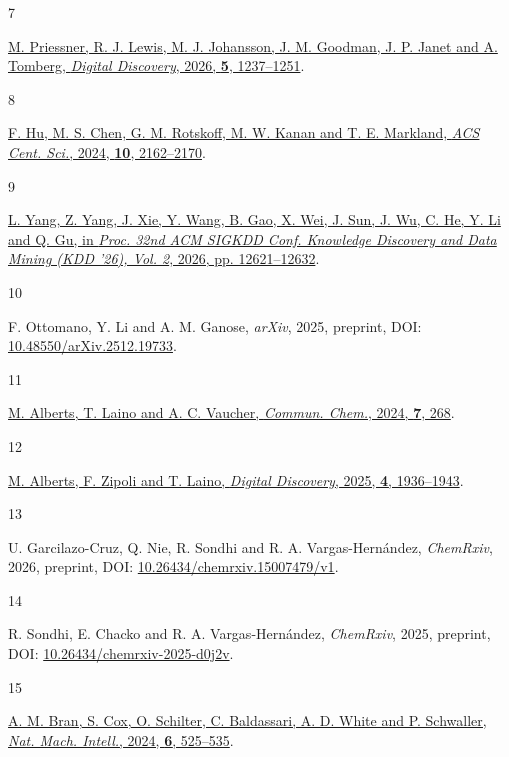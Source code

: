 \documentclass[
  10pt,
]{article}
\newlength{\cslhangindent}
\newlength{\csllabelwidth}
\newlength{\cslentryspacingunit} %
\newenvironment{CSLReferences}[2] %
 {%
  \setlength{\parindent}{0pt}
  \ifodd #1
  \let\oldpar\par
  \def\par{\hangindent=\cslhangindent\oldpar}
  \fi
  \setlength{\parskip}{#2\cslentryspacingunit}
 }%
 {}
\newcommand{\CSLLeftMargin}[1]{\parbox[t]{\csllabelwidth}{#1}}
\newcommand{\CSLRightInline}[1]{\parbox[t]{\linewidth - \csllabelwidth}{#1}\break}
\begin{document}
\begin{CSLReferences}{0}{0}
\leavevmode{}%
\CSLLeftMargin{7 }%
\CSLRightInline{\href{https://doi.org/10.1039/D5DD00359H}{M. Priessner,
R. J. Lewis, M. J. Johansson, J. M. Goodman, J. P. Janet and A. Tomberg,
\emph{Digital Discovery}, 2026, \textbf{5}, 1237--1251}.}

\leavevmode{}%
\CSLLeftMargin{8 }%
\CSLRightInline{\href{https://doi.org/10.1021/acscentsci.4c01132}{F. Hu,
M. S. Chen, G. M. Rotskoff, M. W. Kanan and T. E. Markland, \emph{ACS
Cent. Sci.}, 2024, \textbf{10}, 2162--2170}.}

\leavevmode{}%
\CSLLeftMargin{9 }%
\CSLRightInline{\href{https://doi.org/10.1145/3770855.3818935}{L. Yang,
Z. Yang, J. Xie, Y. Wang, B. Gao, X. Wei, J. Sun, J. Wu, C. He, Y. Li
and Q. Gu, in \emph{Proc. 32nd ACM SIGKDD Conf. Knowledge Discovery and
Data Mining (KDD '26), Vol. 2}, 2026, pp. 12621--12632}.}

\leavevmode{}%
\CSLLeftMargin{10 }%
\CSLRightInline{F. Ottomano, Y. Li and A. M. Ganose, \emph{arXiv}, 2025,
preprint, DOI:
\href{https://doi.org/10.48550/arXiv.2512.19733}{10.48550/arXiv.2512.19733}.}

\leavevmode{}%
\CSLLeftMargin{11 }%
\CSLRightInline{\href{https://doi.org/10.1038/s42004-024-01341-w}{M.
Alberts, T. Laino and A. C. Vaucher, \emph{Commun. Chem.}, 2024,
\textbf{7}, 268}.}

\leavevmode{}%
\CSLLeftMargin{12 }%
\CSLRightInline{\href{https://doi.org/10.1039/d5dd00131e}{M. Alberts, F.
Zipoli and T. Laino, \emph{Digital Discovery}, 2025, \textbf{4},
1936--1943}.}

\leavevmode{}%
\CSLLeftMargin{13 }%
\CSLRightInline{U. Garcilazo-Cruz, Q. Nie, R. Sondhi and R. A.
Vargas-Hernández, \emph{ChemRxiv}, 2026, preprint, DOI:
\href{https://doi.org/10.26434/chemrxiv.15007479/v1}{10.26434/chemrxiv.15007479/v1}.}

\leavevmode{}%
\CSLLeftMargin{14 }%
\CSLRightInline{R. Sondhi, E. Chacko and R. A. Vargas-Hernández,
\emph{ChemRxiv}, 2025, preprint, DOI:
\href{https://doi.org/10.26434/chemrxiv-2025-d0j2v}{10.26434/chemrxiv-2025-d0j2v}.}

\leavevmode{}%
\CSLLeftMargin{15 }%
\CSLRightInline{\href{https://doi.org/10.1038/s42256-024-00832-8}{A. M.
Bran, S. Cox, O. Schilter, C. Baldassari, A. D. White and P. Schwaller,
\emph{Nat. Mach. Intell.}, 2024, \textbf{6}, 525--535}.}


\end{CSLReferences}
\end{document}
